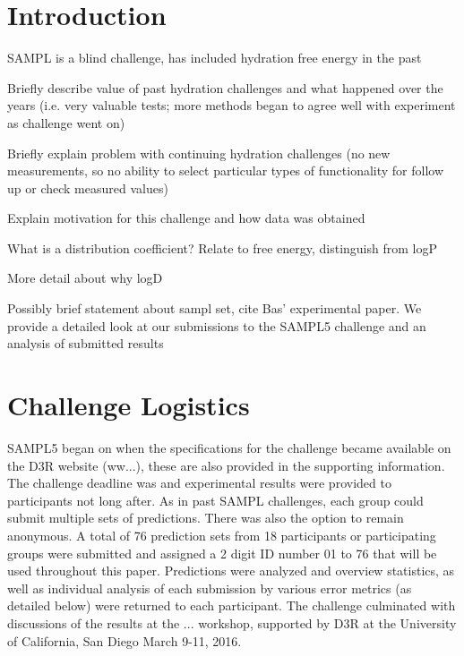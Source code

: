 \section{Introduction}
\label{intro}
SAMPL is a blind challenge, has included hydration free energy in the past

Briefly describe value of past hydration challenges and what happened over the years (i.e. very valuable tests; more methods began to agree well with experiment as challenge went on)

Briefly explain problem with continuing hydration challenges (no new measurements, so no ability to select particular types of functionality for follow up or check measured values)

Explain motivation for this challenge and how data was obtained %


What is a distribution coefficient? Relate to free energy, distinguish from logP

More detail about why logD 

Possibly brief statement about sampl set, cite Bas' experimental paper. We provide a detailed look at our submissions to the SAMPL5 challenge and an analysis of submitted results %


\section{Challenge Logistics}
\label{logistics}
SAMPL5 began on %
when the specifications for the challenge became available on the D3R website (ww...), these are also provided in the supporting information.  %
The challenge deadline was %
and experimental results were provided to participants not long after. 
As in past SAMPL challenges, each group could submit multiple sets of predictions.
There was also the option to remain anonymous.  
A total of 76 prediction sets from 18 participants or participating groups were submitted and assigned a 2 digit ID number 01 to 76 that will be used throughout this paper. 
Predictions were analyzed and overview statistics, as well as individual analysis of each submission by various error metrics (as detailed below) were returned to each participant. 
The challenge culminated with discussions of the results at  the ... workshop, supported by D3R %
at the University of California, San Diego March 9-11, 2016.

